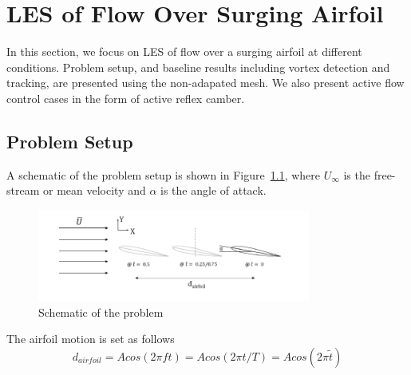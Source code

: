 \chapter{LES of Flow Over Surging Airfoil}
\label{chapter:baseline_results}

In this section, we focus on LES of flow over a surging airfoil at different conditions. Problem setup, and baseline results including vortex detection and tracking, are presented using the non-adapated mesh. We also present active flow control cases in the form of active reflex camber. 



\section{Problem Setup}
\label{sec:problem_setup_baseline}

A schematic of the problem setup is shown in Figure~\ref{fig:SetUpSketch}, where $U_\infty$ is the free-stream or mean velocity and $\alpha$ is the angle of attack.

\begin{figure}[H]
\centering
\includegraphics[width=0.8\textwidth]{figures/Setup/Setup.png}
\caption{Schematic of the problem}
\label{fig:SetUpSketch}
\end{figure}

The airfoil motion is set as follows
\begin{equation}
\label{eq:displacement}
  d_{airfoil} = A cos(2\pi f t) =  Acos(2\pi t/T) = Acos(2\pi\tilde{t})
\end{equation}

